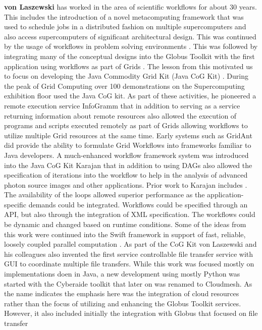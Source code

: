 \documentclass[utf8]{FrontiersinVancouver} %
\begin{document}
{\bf von Laszewski} has worked in the area of scientific workflows for about 30 years. This includes the introduction of a novel metacomputing framework \citep{las-99-loosely,las-94-ecwmf,las-96-ecwmf} that was used to schedule jobs in a distributed fashion on multiple supercomputers and also access supercomputers of significant architectural design. 
This was continued by the usage of workflows in problem solving environments \citep{las-01-pse}. This was followed by integrating many of the conceptual designs into the Globus Toolkit with the first application using workflows as part of Grids \citep{las-00-sbc}. The lesson from this motivated us to focus on developing the Java Commodity Grid Kit (Java CoG Kit) \citep{las-06-workcoordination,
las-06-workflow-book,
las-06-exp-a,
las-05-workflowrepo,
las-05-workflow-jgc,
las-05-exp,
las-04-abstraction-j,
las-03-gridcomputing,
las-02-javacog,
las-00-grande,
las-01-cog-concurency}. 
During the peak of Grid Computing over 100 demonstrations on the Supercomputing exhibition floor used the Java CoG kit. As part of these activities, he pioneered a remote execution service InfoGramm 
\citep{las-02-infogram}
that in addition to serving as a service returning information about remote resources also allowed the execution of programs and scripts executed remotely as part of Grids allowing workflows to utilize multiple Grid resources at the same time. Early systems such as GridAnt \citep{las-04-gridant} 
did provide the ability to formulate Grid Workflows into frameworks familiar to Java developers. A much-enhanced workflow framework system was introduced into the  Java CoG Kit Karajan \citep{las-06-workflow-book} that in addition to using DAGs also allowed the specification of iterations into the workflow to help in the analysis of advanced photon source images and other applications. Prior work to Karajan includes \citep{las-04-gridant,las-01-cog-concurency,las-96-ecwmf}. The availability of the loops allowed superior performance as the application-specific demands could be integrated. Workflows could be specified through an API, but also through the integration of XML specification. The workflows could be dynamic and changed based on runtime conditions. Some of the ideas from this work were continued into the Swift framework in support of fast, reliable, loosely coupled parallel computation \citep{las--7-swift}. 
As part of the CoG Kit von Laszewski and his colleagues also invented the first service controllable file transfer service with GUI to coordinate multiple file transfers. While this work was focused mostly on implementations doen in Java, a new development using mostly Python was started with the Cyberaide toolkit \citep{las-09-ccgrid} that later on was renamed to Cloudmesh. As the name indicates the emphasis here was the integration of cloud resources rather than the focus of utilizing and enhancing the Globus Toolkit services. However, it also included initially the integration with Globus that focused on file transfer 
\end{document}
